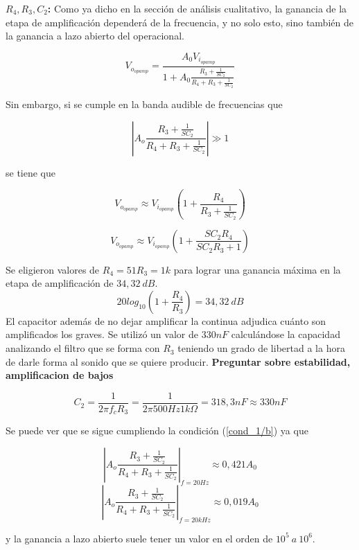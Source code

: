 \textbf{$R_4, R_3, C_2$:} Como ya dicho en la sección de análisis cualitativo, la ganancia de la etapa de amplificación dependerá de la frecuencia, y no solo esto, sino también de la ganancia a lazo abierto del operacional.

\begin{equation}
	V_{o_{opamp}} = \frac{A_0 V_{i_{opamp}}}{1+A_0 \frac{R_3 + \frac{1}{SC_2}}{R_4 + R_3 + \frac{1}{SC_2}}}
\end{equation}

Sin embargo, si se cumple en la banda audible de frecuencias que

\begin{equation}
\left| A_o\frac{R_3 + \frac{1}{SC_2}}{R_4 + R_3 + \frac{1}{SC_2}} \right| \gg 1
\label{cond_1/b}
\end{equation}

se tiene que

\begin{equation}
V_{o_{opamp}} \approx V_{i_{opamp}}\left( 1 + \frac{R_4}{R_3 + \frac{1}{SC_2}}  \right)
\end{equation}

\begin{equation}
	V_{o_{opamp}} \approx V_{i_{opamp}}\left( 1 + \frac{SC_2R_4}{SC_2R_3 + 1}  \right)
\end{equation}

Se eligieron valores de $R_4=51R_3=1k$ para lograr una ganancia máxima en la etapa de amplificación de $34, 32 \ dB$.
\[20log_{10}(1+\frac{R_4}{R_3}) = 34,32 \ dB\]
El capacitor además de no dejar amplificar la continua adjudica cuánto son amplificados los graves. Se utilizó un valor de $330nF$ calculándose la capacidad analizando el filtro que se forma con $R_3$ teniendo un grado de libertad a la hora de darle forma al sonido que se quiere producir. \textbf{Preguntar sobre estabilidad, amplificacion de bajos}

\[ C_2 = \frac{1}{2\pi f_c R_3} = \frac{1}{2\pi 500Hz 1k\Omega} = 318,3nF \approx 330nF \]

Se puede ver que se sigue cumpliendo la condición (\ref{cond_1/b}) ya que

$$ \left| A_o\frac{R_3 + \frac{1}{SC_2}}{R_4 + R_3 + \frac{1}{SC_2}} \right|_{f=20Hz} \approx 0,421A_0 $$
$$ \left| A_o\frac{R_3 + \frac{1}{SC_2}}{R_4 + R_3 + \frac{1}{SC_2}} \right|_{f=20kHz} \approx 0,019A_0 $$

y la ganancia a lazo abierto suele tener un valor en el orden de $10^5 \ a \ 10^6 $.\\

